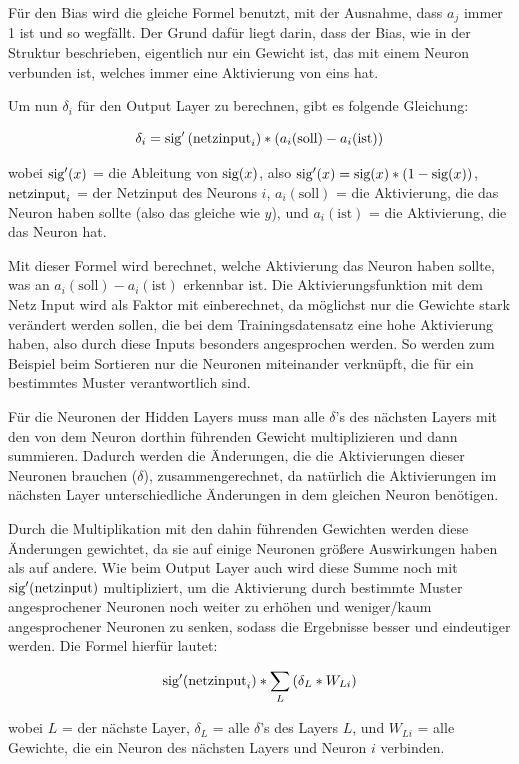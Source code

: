\documentclass{scrartcl}
\begin{document}
	Für den Bias wird die gleiche Formel benutzt, mit der Ausnahme, dass $a_j$ immer 1 ist und so wegfällt. Der Grund dafür liegt darin, dass der Bias, wie in der Struktur beschrieben, eigentlich nur ein Gewicht ist, das mit einem Neuron verbunden ist, welches immer eine Aktivierung von eins hat.

	Um nun $\delta_i$ für den Output Layer zu berechnen, gibt es folgende Gleichung: 

	{\Large \[
		\delta_i = \textrm{sig} '\left({\textrm{netzinput}}_i\right) * (a_i (\textrm{soll}) - a_i (\textrm{ist})) 
	\]}

	wobei $\textrm{sig} '(x)$ = die Ableitung von $\textrm{sig}(x)$, also $\textrm{sig}'(x) = \textrm{sig}(x) * (1 - \textrm{sig}(x))$, $\textrm{netzinput}_i$ = der Netzinput des Neurons $i$, $a_i(\textrm{soll})$ = die Aktivierung, die das Neuron haben sollte (also das gleiche wie $y$), und $a_i(\textrm{ist})$ = die Aktivierung, die das Neuron hat.

	Mit dieser Formel wird berechnet, welche Aktivierung das Neuron haben sollte, was an $a_i(\textrm{soll}) - a_i(\textrm{ist})$ erkennbar ist. Die Aktivierungsfunktion mit dem Netz Input wird als Faktor mit einberechnet, da möglichst nur die Gewichte stark verändert werden sollen, die bei dem Trainingsdatensatz eine hohe Aktivierung haben, also durch diese Inputs besonders angesprochen werden. So werden zum Beispiel beim Sortieren nur die Neuronen miteinander verknüpft, die für ein bestimmtes Muster verantwortlich sind.
	
	Für die Neuronen der Hidden Layers muss man alle $\delta$'s des nächsten Layers mit den von dem Neuron dorthin führenden Gewicht multiplizieren und dann summieren. Dadurch werden die Änderungen, die die Aktivierungen dieser Neuronen brauchen ($\delta$), zusammengerechnet, da natürlich die Aktivierungen im nächsten Layer unterschiedliche Änderungen in dem gleichen Neuron benötigen.
	
	Durch die Multiplikation mit den dahin führenden Gewichten werden diese Änderungen gewichtet, da sie auf einige Neuronen größere Auswirkungen haben als auf andere. Wie beim Output Layer auch wird diese Summe noch mit $\textrm{sig}'(\textrm{netzinput})$ multipliziert, um die Aktivierung durch bestimmte Muster angesprochener Neuronen noch weiter zu erhöhen und weniger/kaum angesprochener Neuronen zu senken, sodass die Ergebnisse besser und eindeutiger werden. Die Formel hierfür lautet:

	{\Large \[\textrm{sig}'({\textrm{netzinput}}_i) * \sum_{L}{\left(\delta_L\ast W_{Li}\right)}\]}

	\noindent wobei $L$ = der nächste Layer, $\delta_L$ = alle $\delta$'s des Layers $L$, und $W_{Li}$ = alle Gewichte, die ein Neuron des nächsten Layers und Neuron $i$ verbinden.
\end{document}

